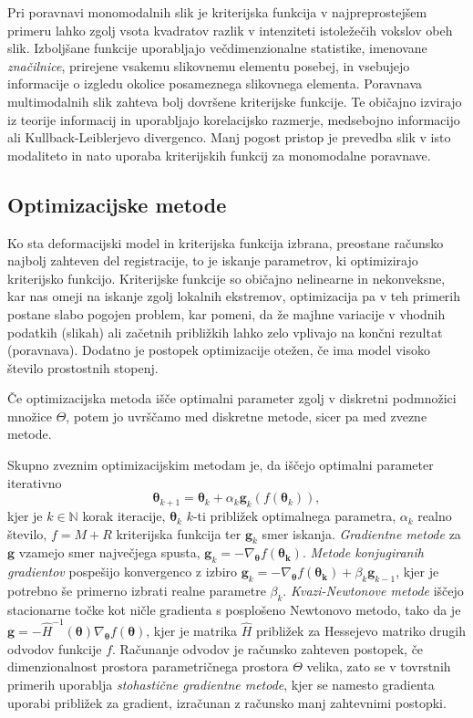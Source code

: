 \documentclass[journal]{IEEEtran}
\begin{document}
Pri poravnavi monomodalnih slik je kriterijska funkcija v najpreprostejšem primeru lahko zgolj vsota kvadratov razlik v intenziteti istoležečih vokslov obeh slik. Izboljšane funkcije uporabljajo večdimenzionalne statistike, imenovane \emph{značilnice}, prirejene vsakemu slikovnemu elementu posebej, in vsebujejo informacije o izgledu okolice posameznega slikovnega elementa. Poravnava multimodalnih slik zahteva bolj dovršene kriterijske funkcije. Te običajno izvirajo iz teorije informacij in uporabljajo korelacijsko razmerje, medsebojno informacijo ali Kullback-Leiblerjevo divergenco. Manj pogost pristop je prevedba slik v isto modaliteto in nato uporaba kriterijskih funkcij za monomodalne poravnave.

\subsection{Optimizacijske metode}

Ko sta deformacijski model in kriterijska funkcija izbrana, preostane računsko najbolj zahteven del registracije, to je iskanje parametrov, ki optimizirajo kriterijsko funkcijo. Kriterijske funkcije so običajno nelinearne in nekonveksne, kar nas omeji na iskanje zgolj lokalnih ekstremov, optimizacija pa v teh primerih postane slabo pogojen problem, kar pomeni, da že majhne variacije v vhodnih podatkih (slikah) ali začetnih približkih lahko zelo vplivajo na končni rezultat (poravnava). Dodatno je postopek optimizacije otežen, če ima model visoko število prostostnih stopenj.

Če optimizacijska metoda išče optimalni parameter zgolj v diskretni podmnožici množice $\Theta$, potem  jo uvrščamo med diskretne metode, sicer pa med zvezne metode.

Skupno zveznim optimizacijskim metodam je, da iščejo optimalni parameter iterativno
\begin{equation}
 \boldsymbol{\theta}_{k+1}=\boldsymbol{\theta}_k+\alpha_k\boldsymbol{g}_k(f(\boldsymbol{\theta}_k)),
\end{equation}
kjer je $k\in\mathbb{N}$ korak iteracije, $\boldsymbol{\theta}_k$ $k$-ti približek optimalnega parametra, $\alpha_k$ realno število, $f=M+R$ kriterijska funkcija ter $\boldsymbol{g}_k$ smer iskanja. \emph{Gradientne metode} za $\boldsymbol{g}$ vzamejo smer največjega spusta, $\boldsymbol{g}_k = -\nabla_{\boldsymbol{\theta}}f(\boldsymbol{\theta_k})$. \emph{Metode konjugiranih gradientov} pospešijo konvergenco z izbiro $\boldsymbol{g}_k = -\nabla_{\boldsymbol{\theta}}f(\boldsymbol{\theta_k})+\beta_k\boldsymbol{g}_{k-1}$, kjer je potrebno še primerno izbrati realne parametre $\beta_k$. \emph{Kvazi-Newtonove metode} iščejo stacionarne točke kot ničle gradienta s posplošeno Newtonovo metodo, tako da je $\boldsymbol{g}=-\hat{H}^{-1}(\boldsymbol{\theta})\nabla_{\boldsymbol{\theta}}f(\boldsymbol{\theta})$, kjer je matrika $\hat{H}$ približek za Hessejevo matriko drugih odvodov funkcije $f$. Računanje odvodov je računsko zahteven postopek, če dimenzionalnost prostora parametričnega prostora $\Theta$ velika, zato se v tovrstnih primerih uporablja \emph{stohastične gradientne metode}, kjer se namesto gradienta uporabi približek za gradient, izračunan z računsko manj zahtevnimi postopki.
\end{document}

